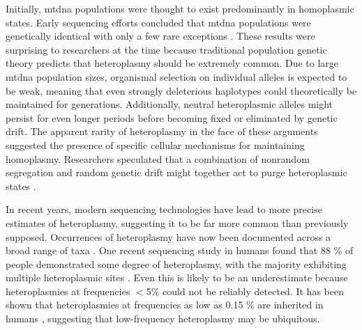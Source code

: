 \documentclass[12pt,twoside]{reedthesis}
\begin{document}
Initially, \gls{mtdna} populations were thought to exist predominantly in homoplasmic states.
Early sequencing efforts concluded that \gls{mtdna} populations were genetically identical with only a few rare exceptions \citep{monnat_nucleotide_1985}.
These results were surprising to researchers at the time because traditional population genetic theory predicts that heteroplasmy should be extremely common. 
Due to large \gls{mtdna} population sizes, organismal selection on individual alleles is expected to be weak, meaning that even strongly deleterious haplotypes could theoretically be maintained for generations.
Additionally, neutral heteroplasmic alleles might persist for even longer periods before becoming fixed or eliminated by genetic drift.
The apparent rarity of heteroplasmy in the face of these arguments suggested the presence of specific cellular mechanisms for maintaining homoplasmy.
Researchers speculated that a combination of nonrandom segregation and random genetic drift might together act to purge heteroplasmic states \citep{birky_inheritance_2001}.

In recent years, modern sequencing technologies have lead to more precise estimates of heteroplasmy, suggesting it to be far more common than previously supposed.
Occurrences of heteroplasmy have now been documented across a broad range of taxa \citep{solignac_mitochondrial_1983, mate_mitochondrial_2007, paduan_mitochondrial_2008, mjelle_halibut_2008, white_revealing_2008, magnacca_tissue_2010, payne_universal_2013, robison_extensive_2015}.
One recent sequencing study in humans found that 88 \% of people demonstrated some degree of heteroplasmy, with the majority exhibiting multiple heteroplasmic sites \citep{naue_evidence_2015}.
Even this is likely to be an underestimate because heteroplasmies at frequencies $<$5\% could not be reliably detected.
It has been shown that heteroplasmies at frequencies as low as 0.15 \% are inherited in humans \citep{guo_very_2013}, suggesting that low-frequency heteroplasmy may be ubiquitous.
\end{document}
